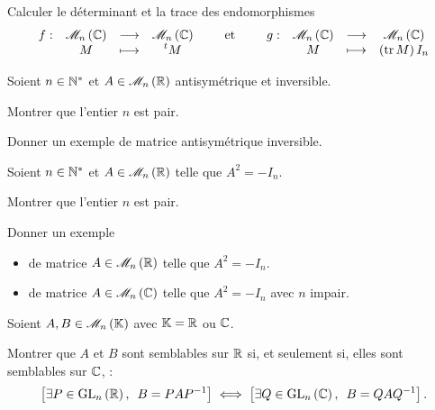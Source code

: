 \begin{corr}
\end{corr}

\begin{exo}
Calculer le déterminant et la trace des endomorphismes \[\fonction{f}{\M{n}[\C]}{\M{n}[\C]}{M}{\trans{M}}\qquad\text{et}\qquad\fonction{g}{\M{n}[\C]}{\M{n}[\C]}{M}{\paren{\tr M}I_n}\]
\end{exo}

\begin{corr}
\end{corr}

\begin{exo}
Soient \(n\in\mathbb{N}^*\) et \(A\in\M{n}[\R]\) antisymétrique et inversible.

Montrer que l'entier \(n\) est pair.

Donner un exemple de matrice antisymétrique inversible.
\end{exo}

\begin{corr}
\end{corr}

\begin{exo}
Soient \(n\in\mathbb{N}^*\) et \(A\in\M{n}[\R]\) telle que \(A^2=-I_n\).

Montrer que l'entier \(n\) est pair.

Donner un exemple

\begin{itemize}
\item de matrice \(A\in\M{n}[\R]\) telle que \(A^2=-I_n\). \\

\item de matrice \(A\in\M{n}[\C]\) telle que \(A^2=-I_n\) avec \(n\) impair.
\end{itemize}
\end{exo}

\begin{corr}
\end{corr}

\begin{exo}
Soient \(A,B\in\M{n}[\K]\) avec \(\mathbb{K}=\mathbb{R}\) ou \(\mathbb{C}\).

Montrer que \(A\) et \(B\) sont semblables sur \(\mathbb{R}\) si, et seulement si, elles sont semblables sur \(\mathbb{C}\), \cad : \[\croch{\quantifs{\exists P\in\GL{n}[\R]}B=PAP\inv}\ssi\croch{\quantifs{\exists Q\in\GL{n}[\C]}B=QAQ\inv}.\]
\end{exo}

